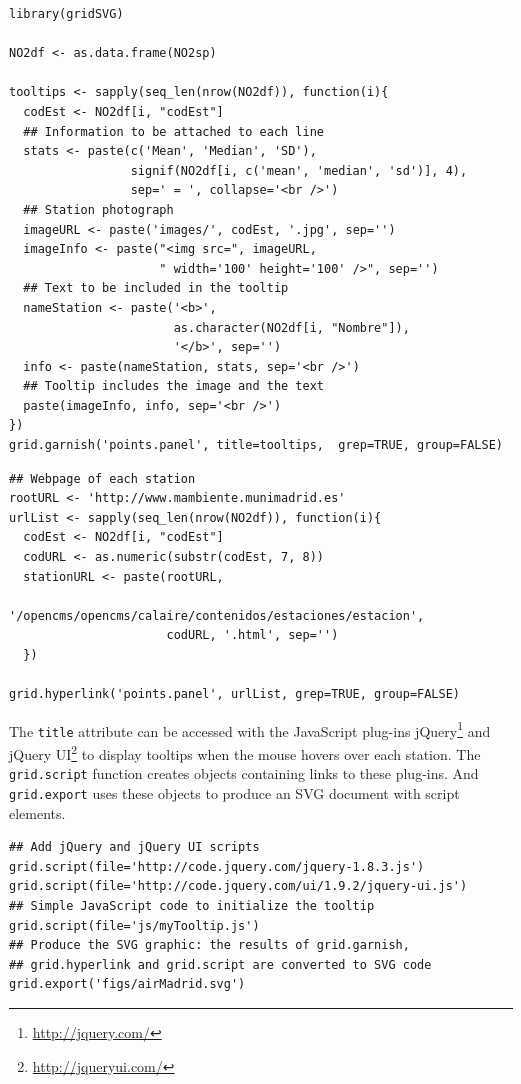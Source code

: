 \documentclass[smallroyalvopaper]{memoir}
\begin{document}
\lstset{language=R,numbers=none}
\begin{lstlisting}
library(gridSVG)

NO2df <- as.data.frame(NO2sp)

tooltips <- sapply(seq_len(nrow(NO2df)), function(i){
  codEst <- NO2df[i, "codEst"]
  ## Information to be attached to each line
  stats <- paste(c('Mean', 'Median', 'SD'),
                 signif(NO2df[i, c('mean', 'median', 'sd')], 4),
                 sep=' = ', collapse='<br />')
  ## Station photograph 
  imageURL <- paste('images/', codEst, '.jpg', sep='')
  imageInfo <- paste("<img src=", imageURL,
                     " width='100' height='100' />", sep='')
  ## Text to be included in the tooltip
  nameStation <- paste('<b>', 
                       as.character(NO2df[i, "Nombre"]),
                       '</b>', sep='')
  info <- paste(nameStation, stats, sep='<br />')
  ## Tooltip includes the image and the text
  paste(imageInfo, info, sep='<br />')
})
grid.garnish('points.panel', title=tooltips,  grep=TRUE, group=FALSE)
\end{lstlisting}



\lstset{language=R,numbers=none}
\begin{lstlisting}
## Webpage of each station
rootURL <- 'http://www.mambiente.munimadrid.es'
urlList <- sapply(seq_len(nrow(NO2df)), function(i){
  codEst <- NO2df[i, "codEst"]
  codURL <- as.numeric(substr(codEst, 7, 8))
  stationURL <- paste(rootURL,
                      '/opencms/opencms/calaire/contenidos/estaciones/estacion',
                      codURL, '.html', sep='')
  })

grid.hyperlink('points.panel', urlList, grep=TRUE, group=FALSE)
\end{lstlisting}


The \texttt{title} attribute can be accessed with the JavaScript plug-ins
jQuery\footnote{\url{http://jquery.com/}} and jQuery UI\footnote{\url{http://jqueryui.com/}} to display tooltips when the mouse
hovers over each station. The \texttt{grid.script} function creates objects
containing links to these plug-ins. And \texttt{grid.export} uses these
objects to produce an SVG document with script elements.


\lstset{language=R,numbers=none}
\begin{lstlisting}
## Add jQuery and jQuery UI scripts
grid.script(file='http://code.jquery.com/jquery-1.8.3.js')
grid.script(file='http://code.jquery.com/ui/1.9.2/jquery-ui.js')
## Simple JavaScript code to initialize the tooltip
grid.script(file='js/myTooltip.js')
## Produce the SVG graphic: the results of grid.garnish,
## grid.hyperlink and grid.script are converted to SVG code
grid.export('figs/airMadrid.svg')
\end{lstlisting}
\end{document}
